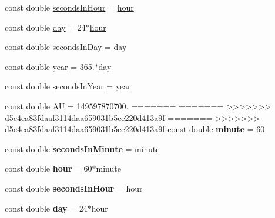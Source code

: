 \begin{DoxyCompactItemize}
const double \hyperlink{namespace_e_g_x_phys_a9a6a4eb13636aa068a3f1e41cde4d6fd}{seconds\+In\+Hour} = \hyperlink{namespace_e_g_x_phys_a85c64ea70cddbb7e4c96adcc01cef6e2}{hour}
\item 
const double \hyperlink{namespace_e_g_x_phys_a24d985ae6f6cefe7e25ac40806b88f79}{day} = 24$\ast$\hyperlink{namespace_e_g_x_phys_a85c64ea70cddbb7e4c96adcc01cef6e2}{hour}
\item 
const double \hyperlink{namespace_e_g_x_phys_ab4f86327f64403b843077ecc189ce52b}{seconds\+In\+Day} = \hyperlink{namespace_e_g_x_phys_a24d985ae6f6cefe7e25ac40806b88f79}{day}
\item 
const double \hyperlink{namespace_e_g_x_phys_afee9eebc1da4a1db2198fe0c45bcb53f}{year} = 365.$\ast$\hyperlink{namespace_e_g_x_phys_a24d985ae6f6cefe7e25ac40806b88f79}{day}
\item 
const double \hyperlink{namespace_e_g_x_phys_aac13efe8296819409bde4a0a8691d56a}{seconds\+In\+Year} = \hyperlink{namespace_e_g_x_phys_afee9eebc1da4a1db2198fe0c45bcb53f}{year}
\item 
const double \hyperlink{namespace_e_g_x_phys_a999332303a2214425184fbe23dbae0c5}{AU} = 149597870700.
=======
=======
>>>>>>> d5c4ea83fdaaf3114daa659031b5ee220d413a9f
=======
>>>>>>> d5c4ea83fdaaf3114daa659031b5ee220d413a9f
\mbox{\label{namespace_e_g_x_phys_ab3a72a63e9c502847d0db88a167dc02b}} 
const double {\bfseries minute} = 60
\item 
\mbox{\label{namespace_e_g_x_phys_a65038e0b58235dc59a44cec16638df35}} 
const double {\bfseries seconds\+In\+Minute} = minute
\item 
\mbox{\label{namespace_e_g_x_phys_a85c64ea70cddbb7e4c96adcc01cef6e2}} 
const double {\bfseries hour} = 60$\ast$minute
\item 
\mbox{\label{namespace_e_g_x_phys_a9a6a4eb13636aa068a3f1e41cde4d6fd}} 
const double {\bfseries seconds\+In\+Hour} = hour
\item 
\mbox{\label{namespace_e_g_x_phys_a24d985ae6f6cefe7e25ac40806b88f79}} 
const double {\bfseries day} = 24$\ast$hour
\item 
\mbox{\label{namespace_e_g_x_phys_ab4f86327f64403b843077ecc189ce52b}} 

\end{DoxyCompactItemize}

